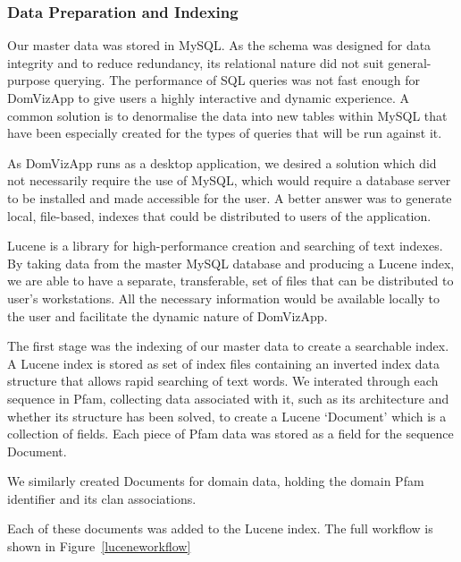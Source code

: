 \subsubsection{Data Preparation and Indexing}
Our master data was stored in MySQL. As the schema was designed for data integrity and to reduce redundancy, its relational nature did not suit general-purpose querying. The performance of SQL queries was not fast enough for DomVizApp to give users a highly interactive and dynamic experience. A common solution is to denormalise the data into new tables within MySQL that have been especially created for the types of queries that will be run against it.

As DomVizApp runs as a desktop application, we desired a solution which did not necessarily require the use of MySQL, which would require a database server to be installed and made accessible for the user. A better answer was to generate local, file-based, indexes that could be distributed to users of the application.

Lucene is a library for high-performance creation and searching of text indexes. By taking data from the master MySQL database and producing a Lucene index, we are able to have a separate, transferable, set of files that can be distributed to user's workstations. All the necessary information would be available locally to the user and facilitate the dynamic nature of DomVizApp.

The first stage was the indexing of our master data to create a searchable index. A Lucene index is stored as set of index files containing an inverted index data structure that allows rapid searching of text words. We interated through each sequence in Pfam, collecting data associated with it, such as its architecture and whether its structure has been solved, to create a Lucene `Document' which is a collection of fields. Each piece of Pfam data was stored as a field for the sequence Document.

We similarly created Documents for domain data, holding the domain Pfam identifier and its clan associations. 

Each of these documents was added to the Lucene index. The full workflow is shown in Figure~\ref{luceneworkflow}

